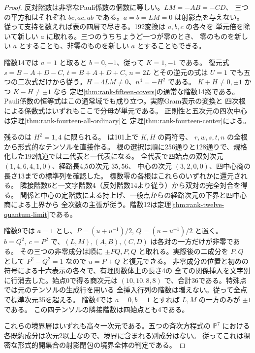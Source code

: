 \begin{proof}
反対階数は非零なPauli係数の個数に等しい。$LM=-AB=-CD$、
三つの平方和はそれぞれ $bc,ac,ab$ である。$a=b=LM=0$ は射影点を与えない。
従って支持を数えれば表の四層で尽きる。192変換は $a,b,c$ の各々を
単元倍を除いて新しい $a$ に取れる。三つのうちちょうど一つが零のとき、
零のものを新しい $a$ とすることも、非零のものを新しい $a$ とすることもできる。

階数14では $a=1$ と取ると $b=0,-1$、従って $K=1,-1$ である。
復元式 $s=B-A+D-C$, $t=B+A+D+C$, $n=2L$ とその逆元の式は
$U=1$ でも五つの二次式だけから従う。$H=4LM\ne0$、$n^4=-H^2$ である。
$K+H\ne0,\pm1$ かつ $K-H\ne\pm1$ なら
定理\ref{thm:rank-fifteen-covers}の通常な階数14窓である。
Pauli係数の恒等式はこの通常域でも成り立つ。実際Gram表示の変換と
四次根による係数式はいずれもここで分母が単元である。
正則性と五次元の四次中心は定理\ref{thm:rank-fourteen-all-ordinary}と
定理\ref{thm:rank-fourteen-center}による。

残るのは $H^2=1,4$ に限られる。
 は101上で $K,H$ の両符号、
$r,w,s,t,n$ の全根から形式的なテンソルを直接作る。
根の選択は順に256通りと128通りで、規格化した192軌道では二代表と一代表になる。
全代表で四始点の双対次元 $(1,4,6,4,1,0)$、経路長4,5の次元 $35,56$、
中心の次元 $(3,2,0,0)$、四中心商の長さ13までの標準列を確認した。
標数零の各根はこれらのいずれかに還元される。
隣接階数6と一文字階数4（反対階数14より従う）から双対の完全対合を得る。
関係と中心の定階数による持上げ、一般点からの経路次元の下界と四中心商による上界から
全次数の主張が従う。階数12は定理\ref{thm:rank-twelve-quantum-limit}である。

階数9では $a=1$ とし、$P=(u+u^{-1})/2$, $Q=(u-u^{-1})/2$ と置く。
$b=Q^2,\ c=P^2$ で、$(L,M),(A,B),(C,D)$ は各対の一方だけが非零である。
その三つの非零成分は順に $\pm PQ,P,Q$ と取れる。実際後の二成分を
$P,Q$ として $P^2-Q^2=1$ なので $u=P+Q$ と復元できる。
非零成分の位置と初めの符号による十六表示の各々で、有理関数体上の長さ4の
全ての関係挿入を文字別に行消去した。始点0で得る商次元は
$(10,10,8,8)$ で、合計36である。特殊点では元のテンソルの生成行を用いる
全挿入行列の階数は増えない。従って全点で標準次元35を超える。
階数4では $a=0,b=1$ とすれば $L,M$ の一方のみが $\pm1$ である。
この四テンソルの隣接階数は四始点とも4である。

これらの境界層はいずれも高々一次元である。五つの斉次方程式の
$\mathbb P^7$ における各既約成分は次元2以上なので、境界に含まれる別成分はない。
従ってこれは稠密な形式的開集合の射影閉包の境界全体の判定である。
\end{proof}


